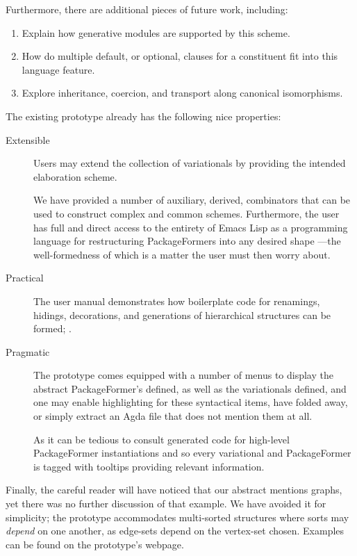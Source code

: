 \documentclass[sigplan,screen]{acmart}
\begin{document}
Furthermore, there are additional pieces of future work, including:

\begin{enumerate}
\item Explain how generative modules \cite{modular_modules}
are supported by this scheme.

\item How do multiple default, or optional, clauses for a constituent fit into this
language feature.

\item Explore inheritance, coercion, and transport along canonical isomorphisms.
\end{enumerate}

The existing prototype already has the following nice properties:

\begin{description}
\item[{Extensible}] Users may extend the collection of variationals by providing the intended
elaboration scheme.

We have provided a number of auxiliary, derived, combinators
that can be used to construct complex and common schemes.
Furthermore, the user has full and direct access to the entirety of Emacs Lisp
as a programming language for restructuring PackageFormers into any desired shape
---the well-formedness of which is a matter the user must then worry about.

\item[{Practical}] The user manual demonstrates how boilerplate code for
            renamings, hidings, decorations, and generations
of hierarchical structures can be formed; \newline
\cite{tpc}.

\item[{Pragmatic}] The prototype comes equipped with a number of menus
to display the abstract PackageFormer's defined,
as well as the variationals defined, and one may
enable highlighting for these syntactical items, have
folded away, or simply extract an Agda file that does not mention
them at all.

As it can be tedious to consult generated code for high-level
PackageFormer instantiations and so every variational and PackageFormer
is tagged with tooltips providing relevant information.
\end{description}

\noindent
Finally, the careful reader will have noticed
that our abstract mentions graphs, yet
there was no further discussion of that example.
We have avoided it for simplicity;
the prototype accommodates multi-sorted structures where
sorts may \emph{depend} on one another, as edge-sets
depend on the vertex-set chosen. Examples can be found on the prototype's
webpage.
\end{document}
